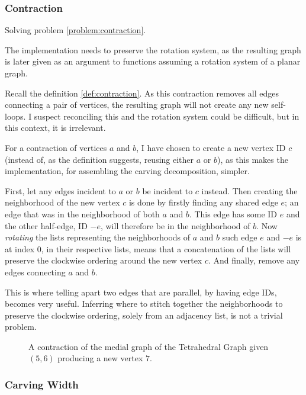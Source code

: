 \documentclass{article}
\begin{document}
		\subsubsection{Contraction}

			Solving problem \ref{problem:contraction}.

			The implementation needs to preserve the rotation system, as the resulting graph is later given as an argument to functions assuming a rotation system of a planar graph.

			Recall the definition \ref{def:contraction}. As this contraction removes all edges connecting a pair of vertices, the resulting graph will not create any new self-loops. I suspect reconciling this and the rotation system could be difficult, but in this context, it is irrelevant.

			For a contraction of vertices $a$ and $b$, I have chosen to create a new vertex ID $c$ (instead of, as the definition suggests, reusing either $a$ or $b$), as this makes the implementation, for assembling the carving decomposition, simpler.

			First, let any edges incident to $a$ or $b$ be incident to $c$ instead. Then creating the neighborhood of the new vertex $c$ is done by firstly finding any shared edge $e$; an edge that was in the neighborhood of both $a$ and $b$. This edge has some ID $e$ and the other half-edge, ID $-e$, will therefore be in the neighborhood of $b$. Now \textit{rotating} the lists representing the neighborhoods of $a$ and $b$ such edge $e$ and $-e$ is at index 0, in their respective lists, means that a concatenation of the lists will preserve the clockwise ordering around the new vertex $c$. And finally, remove any edges connecting $a$ and $b$.

			This is where telling apart two edges that are parallel, by having edge IDs, becomes very useful. Inferring where to stitch together the neighborhoods to preserve the clockwise ordering, solely from an adjacency list, is not a trivial problem.


			\begin{figure}[H]
				\centering
				
				
				\caption{A contraction of the medial graph of the Tetrahedral Graph given $(5,6)$ producing a new vertex $7$.}
				\label{fig:m}
			\end{figure}

		\subsubsection{Carving Width}
\end{document}
